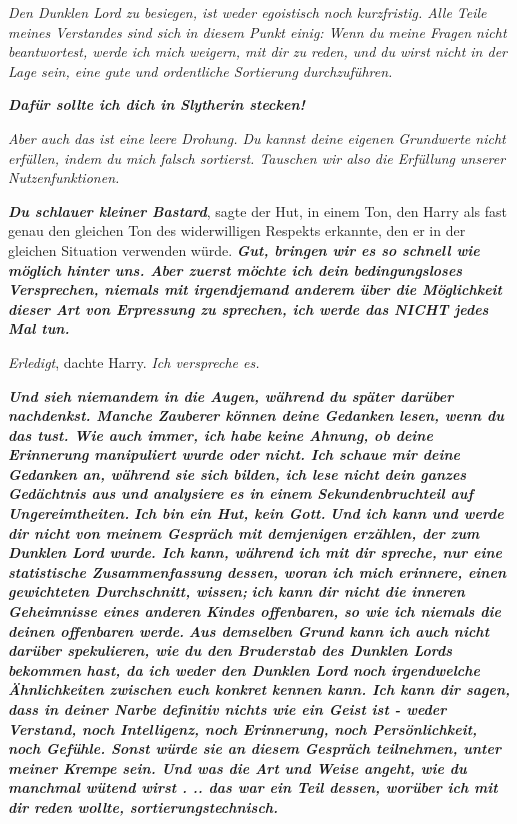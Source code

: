 \emph{Den Dunklen Lord zu besiegen, ist weder egoistisch noch kurzfristig. Alle
Teile meines Verstandes sind sich in diesem Punkt einig: Wenn du meine Fragen
nicht beantwortest, werde ich mich weigern, mit dir zu reden, und du wirst nicht
in der Lage sein, eine gute und ordentliche Sortierung durchzuführen.}

\textbf{\emph{\glqq Dafür sollte ich dich in Slytherin stecken!\grqq{}}}

\emph{Aber auch das ist eine leere Drohung. Du kannst deine eigenen Grundwerte
nicht erfüllen, indem du mich falsch sortierst. Tauschen wir also die Erfüllung
unserer Nutzenfunktionen.}

\textbf{\emph{\glqq Du schlauer kleiner Bastard\grqq{}}}, sagte der Hut, in
einem Ton, den Harry als fast genau den gleichen Ton des widerwilligen Respekts
erkannte, den er in der gleichen Situation verwenden würde. \textbf{\emph{\glqq
Gut, bringen wir es so schnell wie möglich hinter uns. Aber zuerst möchte ich
dein bedingungsloses Versprechen, niemals mit irgendjemand anderem über die
Möglichkeit dieser Art von Erpressung zu sprechen, ich werde das NICHT jedes Mal
tun.\grqq{}}}

\emph{Erledigt}, dachte Harry. \emph{Ich verspreche es.}

\textbf{\emph{\glqq Und sieh niemandem in die Augen, während du später darüber
nachdenkst. Manche Zauberer können deine Gedanken lesen, wenn du das tust. Wie
auch immer, ich habe keine Ahnung, ob deine Erinnerung manipuliert wurde oder
nicht. Ich schaue mir deine Gedanken an, während sie sich bilden, ich lese nicht
dein ganzes Gedächtnis aus und analysiere es in einem Sekundenbruchteil auf
Ungereimtheiten.}} \textbf{\emph{Ich bin ein Hut, kein Gott.}} \textbf{\emph{Und
ich kann und werde dir nicht von meinem Gespräch mit demjenigen erzählen, der
zum Dunklen Lord wurde. Ich kann, während ich mit dir spreche, nur eine
statistische Zusammenfassung dessen, woran ich mich erinnere, einen gewichteten
Durchschnitt, wissen; }} \textbf{\emph{ich kann dir nicht die inneren
Geheimnisse eines anderen Kindes offenbaren, so wie ich niemals die deinen
offenbaren werde.}} \textbf{\emph{Aus demselben Grund kann ich auch nicht
darüber spekulieren, wie du den Bruderstab des Dunklen Lords bekommen hast, da
ich weder den Dunklen Lord noch irgendwelche Ähnlichkeiten zwischen euch konkret
kennen kann. Ich kann dir sagen, dass in deiner Narbe definitiv nichts wie ein
Geist ist - weder Verstand, noch Intelligenz, noch Erinnerung, noch
Persönlichkeit, noch Gefühle. Sonst würde sie an diesem Gespräch teilnehmen,
unter meiner Krempe sein. Und was die Art und Weise angeht, wie du manchmal
wütend wirst . .. das war ein Teil dessen, worüber ich mit dir reden wollte,
sortierungstechnisch.\grqq{}}}

